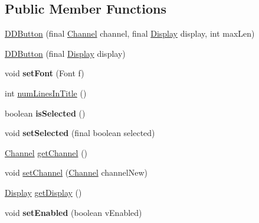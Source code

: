 \subsection*{Public Member Functions}
\begin{DoxyCompactItemize}
\item 
\hyperlink{classgov_1_1fnal_1_1ppd_1_1dd_1_1changer_1_1DDButton_a1afe93de6c48ae6b29f17c945b191a03}{D\-D\-Button} (final \hyperlink{interfacegov_1_1fnal_1_1ppd_1_1dd_1_1signage_1_1Channel}{Channel} channel, final \hyperlink{interfacegov_1_1fnal_1_1ppd_1_1dd_1_1signage_1_1Display}{Display} display, int max\-Len)
\item 
\hyperlink{classgov_1_1fnal_1_1ppd_1_1dd_1_1changer_1_1DDButton_a2f3286123551ed903427c881db67cf4e}{D\-D\-Button} (final \hyperlink{interfacegov_1_1fnal_1_1ppd_1_1dd_1_1signage_1_1Display}{Display} display)
\item 
\hypertarget{classgov_1_1fnal_1_1ppd_1_1dd_1_1changer_1_1DDButton_a89035df233e1eaf57803ecd7db019f06}{void {\bfseries set\-Font} (Font f)}\label{classgov_1_1fnal_1_1ppd_1_1dd_1_1changer_1_1DDButton_a89035df233e1eaf57803ecd7db019f06}

\item 
int \hyperlink{classgov_1_1fnal_1_1ppd_1_1dd_1_1changer_1_1DDButton_aaae6b12a7a8b502ff0f32eda176aaddf}{num\-Lines\-In\-Title} ()
\item 
\hypertarget{classgov_1_1fnal_1_1ppd_1_1dd_1_1changer_1_1DDButton_a322f73398338a9ce0a1c6d15aeee20a7}{boolean {\bfseries is\-Selected} ()}\label{classgov_1_1fnal_1_1ppd_1_1dd_1_1changer_1_1DDButton_a322f73398338a9ce0a1c6d15aeee20a7}

\item 
\hypertarget{classgov_1_1fnal_1_1ppd_1_1dd_1_1changer_1_1DDButton_a250fc97dc3742590c30daa8d3aeffd97}{void {\bfseries set\-Selected} (final boolean selected)}\label{classgov_1_1fnal_1_1ppd_1_1dd_1_1changer_1_1DDButton_a250fc97dc3742590c30daa8d3aeffd97}

\item 
\hyperlink{interfacegov_1_1fnal_1_1ppd_1_1dd_1_1signage_1_1Channel}{Channel} \hyperlink{classgov_1_1fnal_1_1ppd_1_1dd_1_1changer_1_1DDButton_af6fc03e3fc3a0c0840bd998ebbfafeda}{get\-Channel} ()
\item 
void \hyperlink{classgov_1_1fnal_1_1ppd_1_1dd_1_1changer_1_1DDButton_a760896dce737c9968a8f1ab72bb653b6}{set\-Channel} (\hyperlink{interfacegov_1_1fnal_1_1ppd_1_1dd_1_1signage_1_1Channel}{Channel} channel\-New)
\item 
\hyperlink{interfacegov_1_1fnal_1_1ppd_1_1dd_1_1signage_1_1Display}{Display} \hyperlink{classgov_1_1fnal_1_1ppd_1_1dd_1_1changer_1_1DDButton_a5c930bcfa86e4acf18c046b14c7b0038}{get\-Display} ()
\item 
\hypertarget{classgov_1_1fnal_1_1ppd_1_1dd_1_1changer_1_1DDButton_a2ec4396ef290b95199f77069790ff0ec}{void {\bfseries set\-Enabled} (boolean v\-Enabled)}\label{classgov_1_1fnal_1_1ppd_1_1dd_1_1changer_1_1DDButton_a2ec4396ef290b95199f77069790ff0ec}


\end{DoxyCompactItemize}
